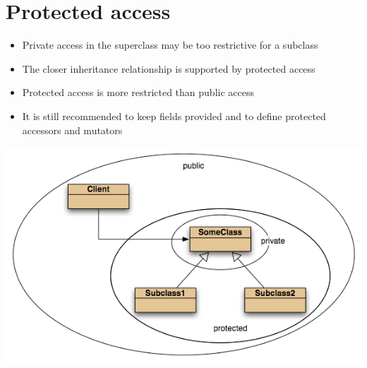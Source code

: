 \documentclass{article}[18pt]
\begin{document}
\section{Protected access}
\begin{itemize}
	\item Private access in the superclass may be too restrictive for a subclass
	\item The closer inheritance relationship is supported by protected access
	\item Protected access is more restricted than public access
	\item It is still recommended to keep fields provided and to define protected accessors and mutators 
\end{itemize}
\begin{center}
	\includegraphics[scale=0.6]{"protected access"}
\end{center}
\end{document}
